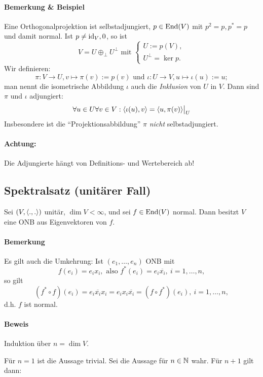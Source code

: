 \paragraph{Bemerkung \& Beispiel}
	 Eine Orthogonalprojektion ist selbstadjungiert, $ p\in \operatorname{End}(V) $ mit $ p^2=p, p^*=p $ und damit normal. Ist $ p\neq \operatorname{id}_V, 0 $, so ist
		 \[ V=U\oplus_\perp U^\perp \text{ mit }
			 \begin{cases}
			 U:= p(V),\\ U^\perp = \ker p.
			 \end{cases} \]
	Wir definieren:
		\[ \pi:V\to U, v\mapsto \pi(v):= p(v) \text{ und } \iota : U\to V, u\mapsto \iota(u):= u; \]
	man nennt die isometrische Abbildung $ \iota $ auch die \emph{Inklusion} von $ U $ in $ V $. Dann sind $ \pi $ und $ \iota $ adjungiert:
		\[ \forall u\in U\forall v\in V: \langle \iota(u),v \rangle = \langle u,\pi(v) \rangle\big|_U \]
	Insbesondere ist die "`Projektionsabbildung"' $ \pi $ \emph{nicht} selbstadjungiert.
\paragraph{Achtung:}
	Die Adjungierte hängt von Definitions- und Wertebereich ab!
	
\subsection{Spektralsatz (unitärer Fall)}
\begin{Satz}[Spektralsatz]
	Sei $ (V,\langle .,. \rangle) $ unitär, $ \dim V<\infty $, und sei $ f\in \operatorname{End}(V) $ normal. Dann besitzt $ V $ eine ONB aus Eigenvektoren von $ f $.
\end{Satz}
\paragraph{Bemerkung}
	Es gilt auch die Umkehrung: Ist $ (e_1,\dots,e_n) $ ONB mit
		\[ f(e_i) = e_ix_i, \text{ also } f^*(e_i) = e_i\overline{x_i},\ i=1,\dots,n, \]
	so gilt
		\[ (f^*\circ f)(e_i) = e_i\overline{x_i}x_i = e_ix_i\overline{x_i} = (f\circ f^*)(e_i),\ i=1,\dots,n, \]
	d.h. $ f $ ist normal.
\paragraph{Beweis}
	Induktion über $ n=\dim V $.
	
	Für $ n=1 $ ist die Aussage trivial. Sei die Aussage für $ n\in\mathbb{N} $ wahr. Für $ n+1 $ gilt dann:
	
